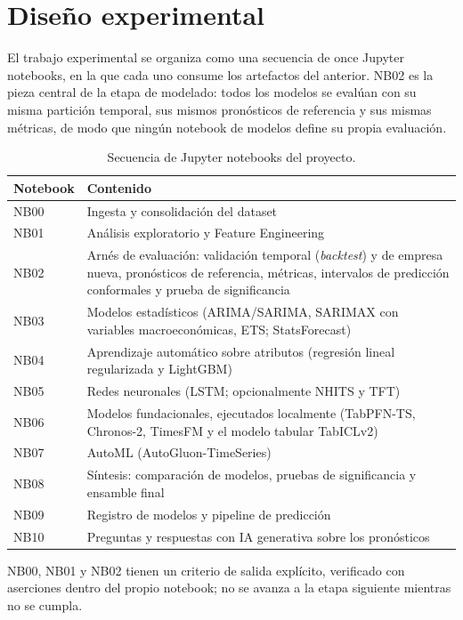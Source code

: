 \documentclass[12pt,letterpaper,oneside]{report}
\renewcommand{\_}{\UnderscoreOriginal\allowbreak}
\begin{document}
\section{Diseño experimental}
\label{sec:diseno-experimental}

El trabajo experimental se organiza como una secuencia de once Jupyter notebooks, en la que cada uno consume los artefactos del anterior. NB02 es la pieza central de la etapa de modelado: todos los modelos se evalúan con su misma partición temporal, sus mismos pronósticos de referencia y sus mismas métricas, de modo que ningún notebook de modelos define su propia evaluación.

\begin{table}[H]
\centering
\caption{Secuencia de Jupyter notebooks del proyecto.}
\label{tab:notebooks}
\begin{tabular}{@{}l>{\raggedright\arraybackslash}p{8.6cm}@{}}
\toprule
Notebook & Contenido \\
\midrule
NB00 & Ingesta y consolidación del dataset \\
NB01 & Análisis exploratorio y Feature Engineering \\
NB02 & Arnés de evaluación: validación temporal (\textit{backtest}) y de empresa nueva, pronósticos de referencia, métricas, intervalos de predicción conformales y prueba de significancia \\
NB03 & Modelos estadísticos (ARIMA/SARIMA, SARIMAX con variables macroeconómicas, ETS; StatsForecast) \\
NB04 & Aprendizaje automático sobre atributos (regresión lineal regularizada y LightGBM) \\
NB05 & Redes neuronales (LSTM; opcionalmente NHITS y TFT) \\
NB06 & Modelos fundacionales, ejecutados localmente (TabPFN-TS, Chronos-2, TimesFM y el modelo tabular TabICLv2) \\
NB07 & AutoML (AutoGluon-TimeSeries) \\
NB08 & Síntesis: comparación de modelos, pruebas de significancia y ensamble final \\
NB09 & Registro de modelos y pipeline de predicción \\
NB10 & Preguntas y respuestas con IA generativa sobre los pronósticos \\
\bottomrule
\end{tabular}
\end{table}

NB00, NB01 y NB02 tienen un criterio de salida explícito, verificado con aserciones dentro del propio notebook; no se avanza a la etapa siguiente mientras no se cumpla.
\end{document}
